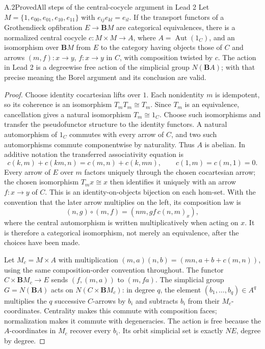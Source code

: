 \begin{result}{A.2}{Proved}{All steps of the central-cocycle argument in Lead 2}
Let $M=\{1,e_{00},e_{01},e_{10},e_{11}\}$ with $e_{ij}e_{kl}=e_{il}$. If the transport functors of a Grothendieck opfibration $E\to\mathbf BM$ are categorical equivalences, there is a normalized central cocycle $c:M\times M\to A$, where $A=\operatorname{Aut}(1_C)$, and an isomorphism over $\mathbf BM$ from $E$ to the category having objects those of $C$ and arrows $(m,f):x\to y$, $f:x\to y$ in $C$, with composition twisted by $c$. The action in Lead 2 is a degreewise free action of the simplicial group $N(\mathbf BA)$; with that precise meaning the Borel argument and its conclusion are valid.
\end{result}
\begin{proof}
Choose identity cocartesian lifts over $1$. Each nonidentity $m$ is idempotent, so its coherence is an isomorphism $T_mT_m\cong T_m$. Since $T_m$ is an equivalence, cancellation gives a natural isomorphism $T_m\cong1_C$. Choose such isomorphisms and transfer the pseudofunctor structure to the identity functors. A natural automorphism of $1_C$ commutes with every arrow of $C$, and two such automorphisms commute componentwise by naturality. Thus $A$ is abelian. In additive notation the transferred associativity equation is
\[
 c(k,m)+c(km,n)=c(m,n)+c(k,mn),\qquad c(1,m)=c(m,1)=0.
\]
Every arrow of $E$ over $m$ factors uniquely through the chosen cocartesian arrow; the chosen isomorphism $T_mx\cong x$ then identifies it uniquely with an arrow $f:x\to y$ of $C$. This is an identity-on-objects bijection on each hom-set. With the convention that the later arrow multiplies on the left, its composition law is
\[
 (n,g)\circ(m,f)=(nm,gf\,c(n,m)_x),
\]
where the central automorphism is written multiplicatively when acting on $x$. It is therefore a categorical isomorphism, not merely an equivalence, after the choices have been made.

Let $M_c=M\times A$ with multiplication
$(m,a)(n,b)=(mn,a+b+c(m,n))$, using the same composition-order convention throughout. The functor $C\times\mathbf B M_c\to E$ sends $(f,(m,a))$ to $(m,f a)$. The simplicial group $G=N(\mathbf BA)$ acts on $N(C\times\mathbf B M_c)$: in degree $q$, the element $(b_1,\ldots,b_q)\in A^q$ multiplies the $q$ successive $C$-arrows by $b_i$ and subtracts $b_i$ from their $M_c$-coordinates. Centrality makes this commute with composition faces; normalization makes it commute with degeneracies. The action is free because the $A$-coordinates in $M_c$ recover every $b_i$. Its orbit simplicial set is exactly $NE$, degree by degree.


\end{proof}
